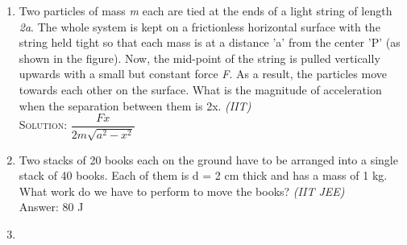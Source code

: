 \begin{enumerate}
    \item Two particles of mass \textit{m} each are tied at the ends of a light string of length \textit{2a}. The whole system is kept on a frictionless horizontal surface with the string held tight so that each mass is at a distance 'a' from the center 'P' (as shown in the figure). Now, the mid-point of the string is pulled vertically upwards with a small but constant force \textit{F}. As a result, the particles move towards each other on the surface. What is the magnitude of acceleration when the separation between them is 2x. \hfill \textsl{(IIT)}\\
\textsc{Solution:} $\dfrac{Fx}{2m \sqrt{a^2- x^2}}$ 

    \item Two stacks of 20 books each on the ground have to be arranged into a single stack of 40 books. Each of them is d = 2 cm thick and has a mass of 1 kg. What work do we have to perform to move the books? \hfill \textsl{(IIT JEE)}
    \\
    Answer: 80 J 
    
    \item 
\end{enumerate}